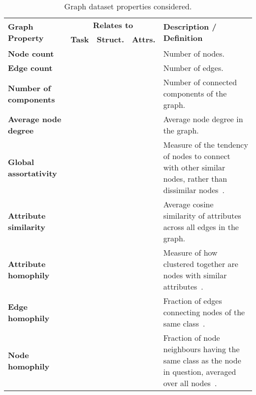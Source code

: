 \begin{table*}
	\caption{Graph dataset properties considered.}
	\label{tab:graph-properties}
	\centering
	\begin{tabularx}{\linewidth}{XcccX}
		\toprule
		\multirow{2}{*}{\textbf{Graph Property}}           & \multicolumn{3}{c}{\textbf{Relates to}}                   & \multirow{2}{*}{\textbf{Description / Definition}} \\
		\cmidrule(lr){2-4}
		                                                   & \textbf{Task} & \textbf{Struct.} & \textbf{Attrs.} & \\
		\midrule
		\textbf{Node count}                                & \crossmark    & \crossmark         & \crossmark          & Number of nodes. \\
		\textbf{Edge count}                                & \crossmark    & \crossmark         & \crossmark          & Number of edges. \\
		\textbf{Number of components}                      & \crossmark    & \checkmark         & \crossmark          & Number of connected components of the graph. \\
		\textbf{Average node degree}                       & \crossmark    & \checkmark         & \crossmark          & Average node degree in the graph. \\
		\textbf{Global assortativity}                      & \crossmark    & \checkmark         & \crossmark          & Measure of the tendency of nodes to connect with other similar nodes, rather than dissimilar nodes~\cite{newman_mixing_2003}. \\
		\textbf{Attribute similarity}                      & \crossmark    & \checkmark         & \checkmark          & Average cosine similarity of attributes across all edges in the graph. \\
		\textbf{Attribute homophily}                       & \checkmark    & \checkmark         & \crossmark          & Measure of how clustered together are nodes with similar attributes~\cite{yang_diverse_2021}. \\
		\textbf{Edge homophily}                            & \checkmark    & \checkmark         & \crossmark          & Fraction of edges connecting nodes of the same class~\cite{zhu_beyond_2020}. \\
		\textbf{Node homophily}                            & \checkmark    & \checkmark         & \crossmark          & Fraction of node neighbours having the same class as the node in question, averaged over all nodes~\cite{pei_geom-gcn_2020}. \\

\end{tabularx}
\end{table*}
